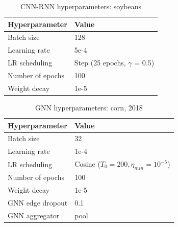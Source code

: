 \begin{table}[H]
\centering
\begin{tabular}{|l|l|} \hline
\textbf{Hyperparameter} & \textbf{Value} \\ \hline
Batch size & 128 \\ \hline
Learning rate & 5e-4 \\ \hline
LR scheduling & Step (25 epochs, $\gamma$ = 0.5)  \\ \hline
Number of epochs & 100 \\ \hline
Weight decay & 1e-5 \\ \hline
\end{tabular}
\caption{CNN-RNN hyperparameters: soybeans}
\label{hyperparams_cnn-rnn_soybean}
\end{table}

\begin{table}[H]
\centering
\begin{tabular}{|l|l|} \hline
\textbf{Hyperparameter} & \textbf{Value} \\ \hline
Batch size & 32 \\ \hline
Learning rate & 1e-4 \\ \hline
LR scheduling & Cosine ($T_0 = 200, \eta_{min} = 10^{-5}$)  \\ \hline
Number of epochs & 100 \\ \hline
Weight decay & 1e-5 \\ \hline
GNN edge dropout & 0.1 \\ \hline
GNN aggregator & pool \\ \hline
\end{tabular}
\caption{GNN hyperparameters: corn, 2018}
\label{hyperparams_gnn_corn_2018}
\end{table}

